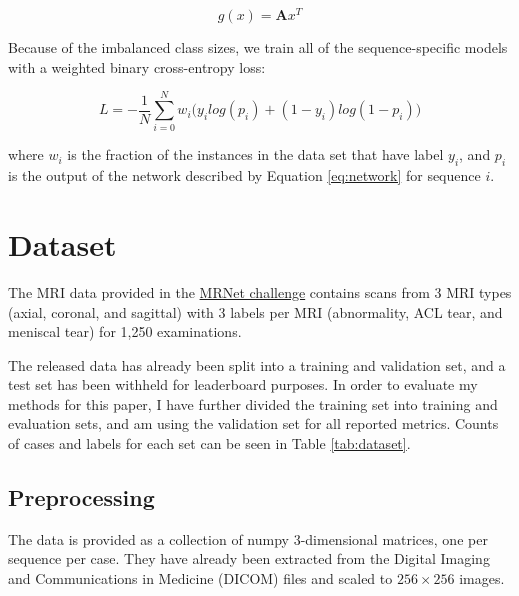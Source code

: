 \documentclass[10pt,twocolumn,letterpaper]{article}
\begin{document}
$$ g(x) = \textbf{A} x^T$$

Because of the imbalanced class sizes, we train all of the sequence-specific models with a weighted binary cross-entropy loss:

$$ L = -\frac{1}{N} \sum_{i=0}^N w_i \big(y_i log(p_i) + (1 - y_i) log(1 - p_i)\big)$$

where $w_i$ is the fraction of the instances in the data set that have label $y_i$, and $p_i$ is the output of the network described by Equation \ref{eq:network} for sequence $i$.

\section{Dataset} %

The MRI data provided in the \href{https://stanfordmlgroup.github.io/competitions/mrnet/}{MRNet challenge} contains scans from 3 MRI types (axial, coronal, and sagittal) with 3 labels per MRI (abnormality, ACL tear, and meniscal tear) for 1,250 examinations.

The released data has already been split into a training and validation set, and a test set has been withheld for leaderboard purposes. In order to evaluate my methods for this paper, I have further divided the training set into training and evaluation sets, and am using the validation set for all reported metrics. Counts of cases and labels for each set can be seen in Table \ref{tab:dataset}.

\subsection{Preprocessing}

The data is provided as a collection of numpy\cite{numpy} 3-dimensional matrices, one per sequence per case. They have already been extracted from the Digital Imaging and Communications in Medicine (DICOM) files and scaled to $256 \times 256$ images.
\end{document}
